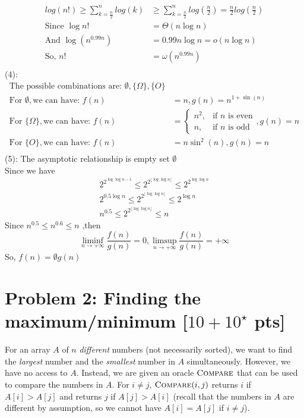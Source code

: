 \documentclass[letterpaper, 11pt]{article}
\newcommand{\1}{\mathds{1}}	%
\theoremstyle{definition}
\newcommand{\problem}[1]{\section*{Problem #1}}
\newenvironment{solution}{{\par\noindent\it Solution.}}{}
\begin{document}
\begin{solution}
\begin{align*}
    log(n!)\geq \sum_{k=\frac{n}{2}}^{n}log(k)&\geq \sum_{k=\frac{n}{2}}^{n}log(\frac{n}{2})=\frac{n}{2}log(\frac{n}{2})\\
    \text{Since } \log n! &= \Theta(n\log n) \\
    \text{And } \log(n^{0.99n}) &=0.99n\log n= o(n\log n) \\
    \text{So, } n! &= \omega(n^{0.99n}) \\
    \end{align*}
    (4): \begin{align*}
    \text{The possible combinations are: }\emptyset,\{\Omega\},\{O\}\\
    \text{For }\emptyset, \text{we can have: }f(n)&=n, g(n) = n^{1+\sin(n)}\\
    \text{For }\{\Omega\}, \text{we can have: }f(n)&=\begin{cases}
        n^2, & \text{if } n \text{ is even} \\
        n, & \text{if } n \text{ is odd}
    \end{cases}, g(n)=n\\
    \text{For }\{O\}, \text{we can have: }f(n)&= n \sin^2(n), g(n)=n\\
    \end{align*}
    (5): 
    The asymptotic relationship is empty set $ \emptyset $ \\
    Since we have\begin{align*}
        2^{2^{\log\log n -1}}\leq 2^{2^{\lfloor \log\log n \rfloor}}\leq 2^{2^{ \log\log n }}\\
        2^{0.5\log n}\leq 2^{2^{\lfloor \log\log n \rfloor}}\leq2^{\log n}\\
        n^{0.5}\leq 2^{2^{\lfloor \log\log n \rfloor}}\leq n
        \end{align*}
    Since $ n^{0.5}\leq n^{0.6}\leq n $ ,then $$
        \liminf_{n\rightarrow +\infty}\frac{f(n)}{g(n)}=0, \limsup_{n\rightarrow +\infty}\frac{f(n)}{g(n)}=+\infty
    $$ 
    So, $f(n)=\emptyset g(n)$
\end{solution}
\problem{2: Finding the maximum/minimum [$10+10^\star$ pts]}
For an array $A$ of $n$ \textit{different} numbers (not necessarily sorted), we want to find the \textit{largest} number and the \textit{smallest} number in $A$ simultaneously.
However, we have no access to $A$.
Instead, we are given an oracle $\textsc{Compare}$ that can be used to compare the numbers in $A$.
For $i \neq j$, $\textsc{Compare}(i,j)$ returns $i$ if $A[i]>A[j]$ and returns $j$ if $A[j]>A[i]$ (recall that the numbers in $A$ are different by assumption, so we cannot have $A[i]=A[j]$ if $i \neq j$).
\end{document}
